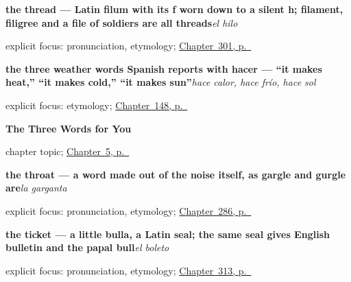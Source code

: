 \noindent\begin{minipage}[t]{\linewidth}
\raggedright
\textbf{the thread — Latin filum with its f worn down to a silent h; filament, filigree and a file of soldiers are all threads}\enspace\emph{el hilo}\par
\footnotesize explicit focus: pronunciation, etymology; \hyperref[ch:mas-cosas-que-pedir]{Chapter~301, p.~\pageref*{ch:mas-cosas-que-pedir}}
\end{minipage}\par\smallskip

\noindent\begin{minipage}[t]{\linewidth}
\raggedright
\textbf{the three weather words Spanish reports with hacer — \textquotedblleft{}it makes heat,\textquotedblright{} \textquotedblleft{}it makes cold,\textquotedblright{} \textquotedblleft{}it makes sun\textquotedblright{}}\enspace\emph{hace calor, hace frío, hace sol}\par
\footnotesize explicit focus: etymology; \hyperref[ch:spanish-weather]{Chapter~148, p.~\pageref*{ch:spanish-weather}}
\end{minipage}\par\smallskip

\noindent\begin{minipage}[t]{\linewidth}
\raggedright
\textbf{The Three Words for You}\par
\footnotesize chapter topic; \hyperref[ch:three-yous]{Chapter~5, p.~\pageref*{ch:three-yous}}
\end{minipage}\par\smallskip

\noindent\begin{minipage}[t]{\linewidth}
\raggedright
\textbf{the throat — a word made out of the noise itself, as gargle and gurgle are}\enspace\emph{la garganta}\par
\footnotesize explicit focus: pronunciation, etymology; \hyperref[ch:donde-duele]{Chapter~286, p.~\pageref*{ch:donde-duele}}
\end{minipage}\par\smallskip

\noindent\begin{minipage}[t]{\linewidth}
\raggedright
\textbf{the ticket — a little bulla, a Latin seal; the same seal gives English bulletin and the papal bull}\enspace\emph{el boleto}\par
\footnotesize explicit focus: pronunciation, etymology; \hyperref[ch:el-mostrador]{Chapter~313, p.~\pageref*{ch:el-mostrador}}
\end{minipage}\par\smallskip

